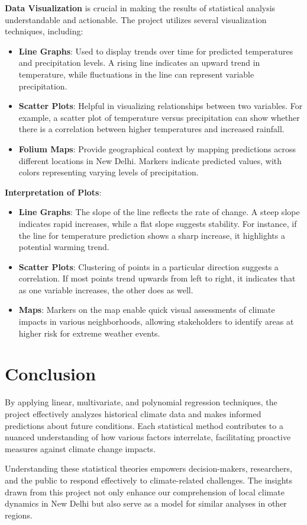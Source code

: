 \documentclass{article}
\begin{document}
\textbf{Data Visualization} is crucial in making the results of statistical analysis understandable and actionable. The project utilizes several visualization techniques, including:

\begin{itemize}
    \item \textbf{Line Graphs}: Used to display trends over time for predicted temperatures and precipitation levels. A rising line indicates an upward trend in temperature, while fluctuations in the line can represent variable precipitation.
    \item \textbf{Scatter Plots}: Helpful in visualizing relationships between two variables. For example, a scatter plot of temperature versus precipitation can show whether there is a correlation between higher temperatures and increased rainfall.
    \item \textbf{Folium Maps}: Provide geographical context by mapping predictions across different locations in New Delhi. Markers indicate predicted values, with colors representing varying levels of precipitation.
\end{itemize}

\textbf{Interpretation of Plots}:
\begin{itemize}
    \item \textbf{Line Graphs}: The slope of the line reflects the rate of change. A steep slope indicates rapid increases, while a flat slope suggests stability. For instance, if the line for temperature prediction shows a sharp increase, it highlights a potential warming trend.
    \item \textbf{Scatter Plots}: Clustering of points in a particular direction suggests a correlation. If most points trend upwards from left to right, it indicates that as one variable increases, the other does as well.
    \item \textbf{Maps}: Markers on the map enable quick visual assessments of climate impacts in various neighborhoods, allowing stakeholders to identify areas at higher risk for extreme weather events.
\end{itemize}

\section{Conclusion}

By applying linear, multivariate, and polynomial regression techniques, the project effectively analyzes historical climate data and makes informed predictions about future conditions. Each statistical method contributes to a nuanced understanding of how various factors interrelate, facilitating proactive measures against climate change impacts.

Understanding these statistical theories empowers decision-makers, researchers, and the public to respond effectively to climate-related challenges. The insights drawn from this project not only enhance our comprehension of local climate dynamics in New Delhi but also serve as a model for similar analyses in other regions.
\end{document}
